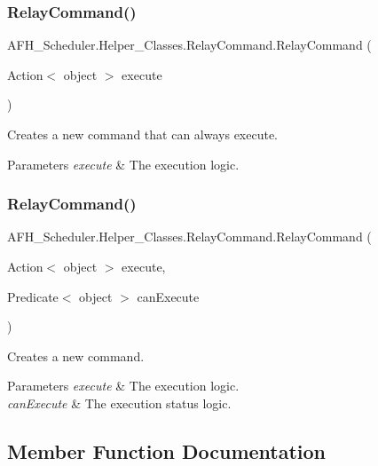 \subsubsection{RelayCommand()\hspace{0.1cm}{\footnotesize\ttfamily [1/2]}}
{\footnotesize\ttfamily A\+F\+H\+\_\+\+Scheduler.\+Helper\+\_\+\+Classes.\+Relay\+Command.\+Relay\+Command (\begin{DoxyParamCaption}\item[{Action$<$ object $>$}]{execute }\end{DoxyParamCaption})}



Creates a new command that can always execute. 


\begin{DoxyParams}{Parameters}
{\em execute} & The execution logic.\\
\hline
\end{DoxyParams}
\mbox{\label{class_a_f_h___scheduler_1_1_helper___classes_1_1_relay_command_aae03715968d32f5b266c478a21b90525}} 
\subsubsection{RelayCommand()\hspace{0.1cm}{\footnotesize\ttfamily [2/2]}}
{\footnotesize\ttfamily A\+F\+H\+\_\+\+Scheduler.\+Helper\+\_\+\+Classes.\+Relay\+Command.\+Relay\+Command (\begin{DoxyParamCaption}\item[{Action$<$ object $>$}]{execute,  }\item[{Predicate$<$ object $>$}]{can\+Execute }\end{DoxyParamCaption})}



Creates a new command. 


\begin{DoxyParams}{Parameters}
{\em execute} & The execution logic.\\
\hline
{\em can\+Execute} & The execution status logic.\\
\hline
\end{DoxyParams}


\subsection{Member Function Documentation}
\mbox{\label{class_a_f_h___scheduler_1_1_helper___classes_1_1_relay_command_a2aa7e10167235d08223fab7d5d9844ed}} 
